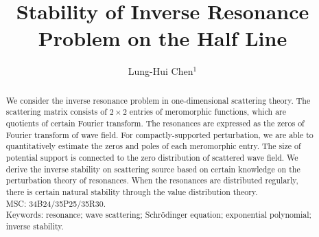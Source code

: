 \documentclass[10pt,a4paper]{article}
\theoremstyle{plain}
\theoremstyle{definition}
\theoremstyle{remark}
\numberwithin{equation}{section}
\begin{document}
\title{Stability of Inverse Resonance Problem on the Half Line }
\author{Lung-Hui Chen$^1$}\maketitle{}\maketitle
\begin{abstract}
We consider the inverse resonance problem in one-dimensional scattering theory. The scattering matrix consists of $2\times 2$ entries of meromorphic functions, which are quotients of certain Fourier transform. The resonances are expressed as the zeros of Fourier transform of wave field. For compactly-supported perturbation, we are able to quantitatively estimate the zeros and poles of each meromorphic entry. The size of potential support is connected to the zero distribution of scattered wave field. We derive the inverse stability on scattering source based on certain knowledge on the perturbation theory of resonances. When the resonances are distributed regularly, there is certain natural stability through the value distribution theory.
\\MSC: 34B24/35P25/35R30.
\\Keywords:  resonance; wave scattering; Schr\"{o}dinger equation; exponential polynomial; inverse stability.
\end{abstract}
\end{document}
